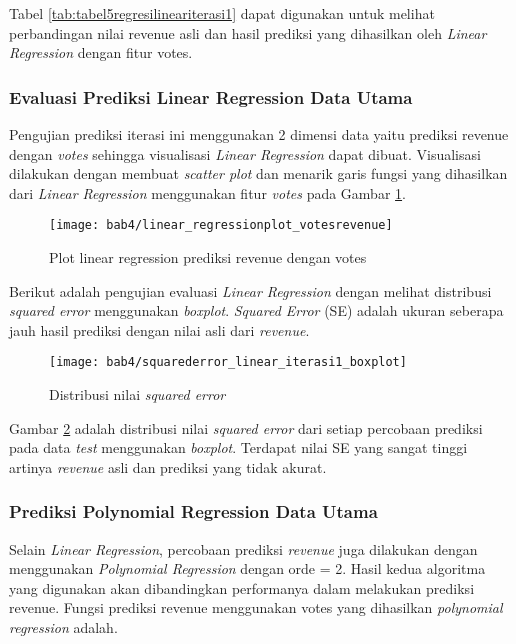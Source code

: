 Tabel \ref{tab:tabel5regresilineariterasi1} dapat digunakan untuk melihat perbandingan nilai revenue asli dan hasil prediksi yang dihasilkan oleh \textit{Linear Regression} dengan fitur votes.

\subsubsection{Evaluasi Prediksi Linear Regression Data Utama}
Pengujian prediksi iterasi ini menggunakan 2 dimensi data yaitu prediksi revenue dengan \textit{votes} sehingga visualisasi \textit{Linear Regression} dapat dibuat. Visualisasi dilakukan dengan membuat \textit{scatter plot} dan menarik garis fungsi yang dihasilkan dari \textit{Linear Regression} menggunakan fitur \textit{votes} pada Gambar \ref{fig:linear_regressionplot_votesrevenue}. 

\begin{figure}[H]
	\centering  
	\texttt{[image: bab4/linear\_regressionplot\_votesrevenue]}   
	\caption{Plot linear regression prediksi revenue dengan votes}	\label{fig:linear_regressionplot_votesrevenue} 
\end{figure} 

Berikut adalah pengujian evaluasi \textit{Linear Regression} dengan melihat distribusi \textit{squared error} menggunakan \textit{boxplot}. \textit{Squared Error} (SE) adalah ukuran seberapa jauh hasil prediksi dengan nilai asli dari \textit{revenue}. 

\begin{figure}[H]
	\centering  
	\texttt{[image: bab4/squarederror\_linear\_iterasi1\_boxplot]}   
	\caption{Distribusi nilai \textit{squared error}}
	\label{fig:squarederror_linear_iterasi1_boxplot} 
\end{figure} 

Gambar \ref{fig:squarederror_linear_iterasi1_boxplot} adalah distribusi nilai \textit{squared error} dari setiap percobaan prediksi pada data \textit{test} menggunakan \textit{boxplot}. Terdapat nilai SE yang sangat tinggi artinya \textit{revenue} asli dan prediksi yang tidak akurat.


\subsubsection{Prediksi Polynomial Regression Data Utama}
Selain \textit{Linear Regression}, percobaan prediksi \textit{revenue} juga dilakukan dengan menggunakan \textit{Polynomial Regression} dengan orde = 2. Hasil kedua algoritma yang digunakan akan dibandingkan performanya dalam melakukan prediksi revenue. Fungsi prediksi revenue menggunakan votes yang dihasilkan \textit{polynomial regression} adalah.

